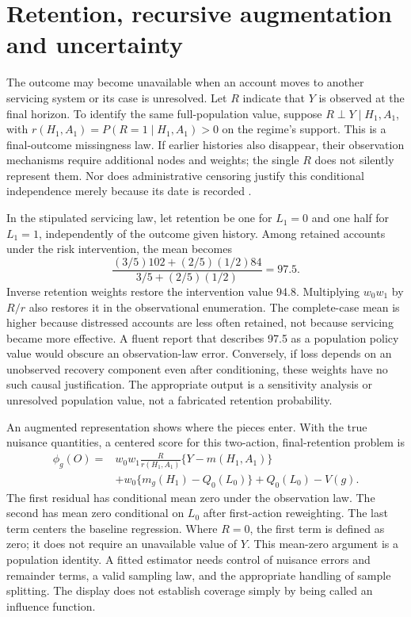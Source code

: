 \section{Retention, recursive augmentation and uncertainty}
\label{exec14:l5-retention}

The outcome may become unavailable when an account moves to another servicing
system or its case is unresolved. Let $R$ indicate that $Y$ is observed at the
final horizon. To identify the same full-population value, suppose
$R\perp Y\mid H_1,A_1$, with
$r(H_1,A_1)=P(R=1\mid H_1,A_1)>0$ on the regime's support. This is a final-outcome
missingness law. If earlier histories also disappear, their observation
mechanisms require additional nodes and weights; the single $R$ does not
silently represent them. Nor does administrative censoring justify this
conditional independence merely because its date is recorded
\cite{hernan2020}.

In the stipulated servicing law, let retention be one for $L_1=0$ and one half
for $L_1=1$, independently of the outcome given history. Among retained accounts
under the risk intervention, the mean becomes
\[
 \frac{(3/5)102+(2/5)(1/2)84}{3/5+(2/5)(1/2)}=97.5.
\]
Inverse retention weights restore the intervention value 94.8. Multiplying
$w_0w_1$ by $R/r$ also restores it in the observational enumeration. The
complete-case mean is higher because distressed accounts are less often
retained, not because servicing became more effective. A fluent report that
describes 97.5 as a population policy value would obscure an observation-law
error. Conversely, if loss depends on an unobserved recovery component even
after conditioning, these weights have no such causal justification. The
appropriate output is a sensitivity analysis or unresolved population value,
not a fabricated retention probability.

An augmented representation shows where the pieces enter. With the true
nuisance quantities, a centered score for this two-action, final-retention
problem is
\begin{align}
 \phi_g(O)={}&w_0w_1\frac{R}{r(H_1,A_1)}
          \{Y-m(H_1,A_1)\}\nonumber\\
 &+w_0\{m_g(H_1)-Q_0(L_0)\}+Q_0(L_0)-V(g).
 \label{eq:exec14-l5-score}
\end{align}
The first residual has conditional mean zero under the observation law. The
second has mean zero conditional on $L_0$ after first-action reweighting.
The last term centers the baseline regression. Where $R=0$, the first term
is defined as zero; it does not require an unavailable value of $Y$. This
mean-zero argument is a population identity. A fitted estimator needs control
of nuisance errors and remainder terms, a valid sampling law, and the
appropriate handling of sample splitting. The display does not establish
coverage simply by being called an influence function.

